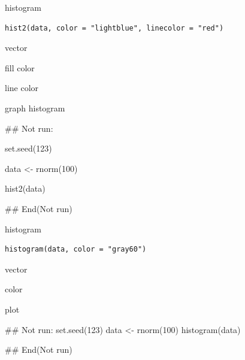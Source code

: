 \documentclass[a4paper]{book}
\begin{document}
%
\begin{Description}
histogram
\end{Description}
%
\begin{Usage}
\begin{verbatim}
hist2(data, color = "lightblue", linecolor = "red")
\end{verbatim}
\end{Usage}
%
\begin{Arguments}
\begin{ldescription}
\item[\code{data}] vector

\item[\code{color}] fill color

\item[\code{linecolor}] line color
\end{ldescription}
\end{Arguments}
%
\begin{Value}
graph histogram
\end{Value}
%
\begin{Examples}
\begin{ExampleCode}
 \#\# Not run: 

set.seed(123)

data <- rnorm(100)

hist2(data)

 
## End(Not run)

\end{ExampleCode}
\end{Examples}
%
\begin{Description}
histogram
\end{Description}
%
\begin{Usage}
\begin{verbatim}
histogram(data, color = "gray60")
\end{verbatim}
\end{Usage}
%
\begin{Arguments}
\begin{ldescription}
\item[\code{data}] vector

\item[\code{color}] color
\end{ldescription}
\end{Arguments}
%
\begin{Value}
plot
\end{Value}
%
\begin{Examples}
\begin{ExampleCode}
\#\# Not run: 
set.seed(123)
data <- rnorm(100)
histogram(data)


## End(Not run)

\end{ExampleCode}
\end{Examples}
\end{document}
